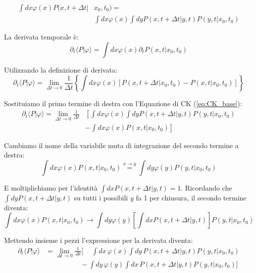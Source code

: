 \begin{align}
\int dx  \varphi(x)  P(x,t+\Delta t|&x_0,t_0)  = \nonumber  \\ &\int dx  \varphi(x) \int dy P(x,t+\Delta t|y,t)P(y,t|x_0,t_0)
\end{align}

La derivata temporale è:
\begin{equation}
\partial_t \langle P | \varphi \rangle = \int dx \varphi(x) \partial_t P(x, t | x_0, t_0)
\end{equation}

Utilizzando la definizione di derivata:
\begin{equation}
\partial_t \langle P | \varphi \rangle = \lim_{\Delta t \to 0} \frac{1}{\Delta t} \left\{ \int dx \varphi(x) [P(x, t+\Delta t | x_0, t_0) - P(x, t | x_0, t_0)] \right\}
\end{equation}

Sostituiamo il primo termine di destra con l'Equazione di CK (\ref{eq:CK_base}):
\begin{equation} 
\begin{aligned}
\partial_t \langle P | \varphi \rangle = \lim_{\Delta t \rightarrow 0} \frac{1}{\Delta t} & \left[ \int dx \varphi(x) \int dy P(x,t+\Delta t|y,t)P(y,t|x_0,t_0) \right.  \\  & \left.  - \int dx \varphi(x) P(x,t|x_0,t_0) \right] 
\end{aligned}
\end{equation}

Cambiamo il nome della variabile muta di integrazione del secondo termine a destra:
\begin{equation}
\int dx \varphi(x) P(x,t|x_0,t_0) \stackrel{x \to y}{=} \int dy \varphi(y) P(y,t|x_0,t_0)
\end{equation}

E moltiplichiamo per l'identità $\int dx P(x,t+\Delta t|y,t) = 1$. Ricordando che $\int dy P(x, t+\Delta t | y, t)$ su tutti i possibili $y$ fa 1 per chiusura, il secondo termine diventa:
\begin{equation}
\int dx \varphi(x) P(x,t|x_0,t_0) \to \int dy  \varphi(y)  \left[ \int dx P(x,t+\Delta t|y,t) \right]P(y,t|x_0,t_0)
\end{equation}

Mettendo insieme i pezzi l'expressione per la derivata diventa:
\begin{equation}
\begin{aligned}
\partial_t \langle P|\varphi \rangle &= \lim_{\Delta t \rightarrow 0} \frac{1}{\Delta t} \Biggl[
\phantom{-} \int dx \, \varphi(x) \int dy \, P(x,t+\Delta t|y,t)P(y,t|x_0,t_0) \\
& \quad \quad\quad\quad\quad - \int dy \, \varphi(y) \int dx \, P(x,t+\Delta t|y,t) P(y,t|x_0,t_0)
\Biggr]
\end{aligned}
\label{eq:derivata_p_omega}
\end{equation}

